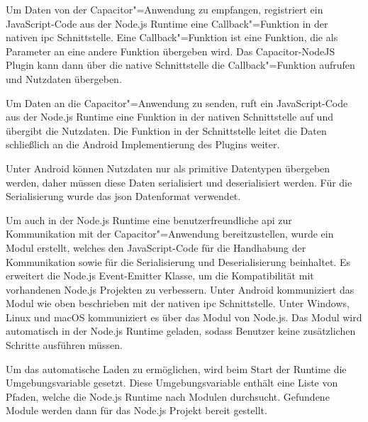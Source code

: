 \vspace{-1em}

Um Daten von der Capacitor"=Anwendung zu empfangen, registriert ein JavaScript-Code aus der Node.js Runtime eine Callback"=Funktion in der nativen \ac{ipc} Schnittstelle.
Eine Callback"=Funktion ist eine Funktion, die als Parameter an eine andere Funktion übergeben wird.
Das Capacitor-NodeJS Plugin kann dann über die native Schnittstelle die Callback"=Funktion aufrufen und Nutzdaten übergeben.

Um Daten an die Capacitor"=Anwendung zu senden, ruft ein JavaScript-Code aus der Node.js Runtime eine Funktion in der nativen Schnittstelle auf und übergibt die Nutzdaten.
Die Funktion in der Schnittstelle leitet die Daten schließlich an die Android Implementierung des Plugins weiter.

Unter Android können Nutzdaten nur als primitive Datentypen übergeben werden, daher müssen diese Daten serialisiert und deserialisiert werden.
Für die Serialisierung wurde das \ac{json} Datenformat verwendet.

Um auch in der Node.js Runtime eine benutzerfreundliche \ac{api} zur Kommunikation mit der Capacitor"=Anwendung bereitzustellen, wurde ein  Modul erstellt, welches den JavaScript-Code für die Handhabung der Kommunikation sowie für die Serialisierung und Deserialisierung beinhaltet.
Es erweitert die Node.js Event-Emitter Klasse, um die Kompatibilität mit vorhandenen Node.js Projekten zu verbessern.
Unter Android kommuniziert das Modul wie oben beschrieben mit der nativen \ac{ipc} Schnittstelle.
Unter Windows, Linux und macOS kommuniziert es über das  Modul von Node.js.
Das  Modul wird automatisch in der Node.js Runtime geladen, sodass Benutzer keine zusätzlichen Schritte ausführen müssen.

Um das automatische Laden zu ermöglichen, wird beim Start der Runtime die Umgebungsvariable  gesetzt.
Diese Umgebungsvariable enthält eine Liste von Pfaden, welche die Node.js Runtime nach Modulen durchsucht.
Gefundene Module werden dann für das Node.js Projekt bereit gestellt.
\cite{nodejs-mobile:docs, nodejs}
